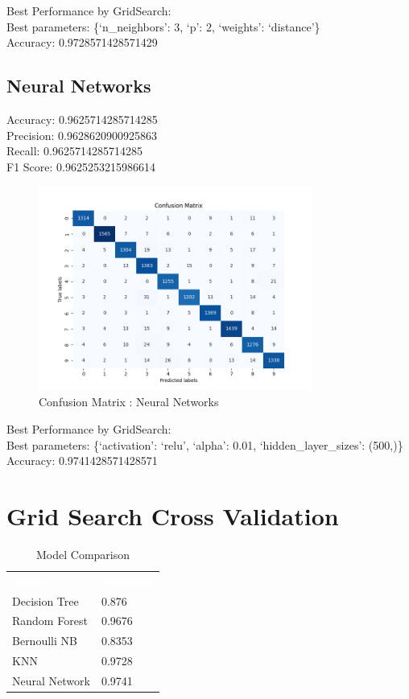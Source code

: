 \documentclass{assignmeownt}
\begin{document}
Best Performance by GridSearch:\\
Best parameters: \{`n\_neighbors': 3, `p': 2, `weights': `distance'\}\\
Accuracy: 0.9728571428571429\\
\clearpage
\subsection{Neural Networks}
Accuracy: 0.9625714285714285 \\
Precision: 0.9628620900925863 \\
Recall: 0.9625714285714285 \\
F1 Score: 0.9625253215986614 \\
\begin{figure}[H]
    \centering
    \includegraphics[width=0.8\textwidth]{images/nnConMat.png}
    \caption{Confusion Matrix : Neural Networks}
    \label{fig:1}
\end{figure}

Best Performance by GridSearch:\\
Best parameters: \{`activation': `relu', `alpha': 0.01, `hidden\_layer\_sizes': (500,)\}\\
Accuracy: 0.9741428571428571\\

\clearpage
\section{Grid Search Cross Validation}
\begin{table}[htbp]
  \centering
  \begin{tabular}{ll}
    \rowcolor{blue}
    \textbf{\textcolor{white}{Model}} & \textbf{\textcolor{white}{Accuracy}} \\
    Decision Tree & 0.876 \\
    Random Forest & 0.9676 \\
    Bernoulli NB & 0.8353 \\
    KNN & 0.9728 \\
    Neural Network & 0.9741 \\
  \end{tabular}
  \caption{Model Comparison}
  \label{tab:model_comparison}
\end{table}
\end{document}
